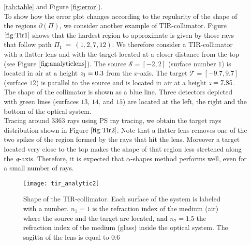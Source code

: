  \ref{tab:table} and Figure \ref{fig:error}).
 \\\indent To show how the error plot changes according to the regularity of the shape of the regions $\partial$$(\Pi)$, we consider another example of TIR-collimator.
 Figure $\ref{fig:Tir1}$ shows that the hardest region to approximate is given by those rays that follow path $\Pi_1 ~=~ (1,2,7,12)$.
 We therefore consider a TIR-collimator with a flatter lens and with the target located at a closer distance from the top (see Figure $\ref{fig:analyticlens}$). 
The source $\mathcal{S}= [-2,2]$ (surface number $1$) is located in air at a height $\textit{z}_1 = 0.3$ from the $x$-axis.
       The target $\mathcal{T}= [-9.7, 9.7]$ (surface $12$) is parallel to the source and is located in air at a height $ \textit{z}= 7.85$.
       The shape of the collimator is shown as a blue line.
       Three detectors depicted with green lines (surfaces $13$, $14$, and $15$) are located at the left, the right and the bottom of the optical system.
 \\ \indent Tracing around $3363$ rays using PS ray tracing, we obtain the target rays distribution shown in Figure $\ref{fig:Tir2}$. 
Note that a flatter lens removes one of the two spikes of the region formed by the rays that hit the lens.
Moreover a target located very close to the top makes the shape of that region less stretched along the $\textit{q}$-axis.
Therefore, it is expected that $\alpha$-shapes method performs well, even for a small number of rays.
\begin{figure}[h]
  \begin{center}
  \texttt{[image: tir\_analytic2]}
   \end{center}
    \caption{Shape of the TIR-collimator. Each surface of the system is labeled with a number.
       $n_1 = 1$ is the refraction index of the medium (air) where the source and the target are located, and
       $n_2 = 1.5 $ the refraction index of the medium (glass) inside the optical system. The sagitta of the lens is equal to $0.6$}
 \label{fig:analyticlens}
\end{figure}
